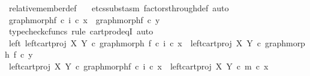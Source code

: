 \begin{isabellebody}
\ relative{\isacharunderscore}{\kern0pt}member{\isacharunderscore}{\kern0pt}def{}\ \isamarkupfalse%
\ {\isacharparenleft}{\kern0pt}{\isacharminus}{\kern0pt}{\isacharcomma}{\kern0pt}\ etcs{\isacharunderscore}{\kern0pt}subst{\isacharunderscore}{\kern0pt}asm\ factors{\isacharunderscore}{\kern0pt}through{\isacharunderscore}{\kern0pt}def{}{\isacharcomma}{\kern0pt}\ auto{\isacharparenright}{\kern0pt}\isanewline
\isanewline
\ \ \ \ \ \ \isamarkupfalse%
\ {\isachardoublequoteopen}graph{\isacharunderscore}{\kern0pt}morph{\isacharparenleft}{\kern0pt}f{\isacharparenright}{\kern0pt}\ {\isasymcirc}\isactrlsub c\ i\ {\isasymcirc}\isactrlsub c\ x{\isacharprime}{\kern0pt}\ {\isacharequal}{\kern0pt}\ graph{\isacharunderscore}{\kern0pt}morph{\isacharparenleft}{\kern0pt}f{\isacharparenright}{\kern0pt}\ {\isasymcirc}\isactrlsub c\ y{\isacharprime}{\kern0pt}{\isachardoublequoteclose}\isanewline
\ \ \ \ \ \ \isamarkupfalse%
\ {\isacharparenleft}{\kern0pt}typecheck{\isacharunderscore}{\kern0pt}cfuncs{\isacharcomma}{\kern0pt}\ rule\ cart{\isacharunderscore}{\kern0pt}prod{\isacharunderscore}{\kern0pt}eqI{\isacharcomma}{\kern0pt}\ auto{\isacharparenright}{\kern0pt}\isanewline
\ \ \ \ \ \ \ \ \isamarkupfalse%
\ left{\isacharcolon}{\kern0pt}\ {\isachardoublequoteopen}left{\isacharunderscore}{\kern0pt}cart{\isacharunderscore}{\kern0pt}proj\ X\ Y\ {\isasymcirc}\isactrlsub c\ graph{\isacharunderscore}{\kern0pt}morph\ f\ {\isasymcirc}\isactrlsub c\ i\ {\isasymcirc}\isactrlsub c\ x{\isacharprime}{\kern0pt}\ {\isacharequal}{\kern0pt}\ left{\isacharunderscore}{\kern0pt}cart{\isacharunderscore}{\kern0pt}proj\ X\ Y\ {\isasymcirc}\isactrlsub c\ graph{\isacharunderscore}{\kern0pt}morph\ f\ {\isasymcirc}\isactrlsub c\ y{\isacharprime}{\kern0pt}{\isachardoublequoteclose}\isanewline
\ \ \ \ \ \ \ \ \isamarkupfalse%
\ {\isacharminus}{\kern0pt}\isanewline
\ \ \ \ \ \ \ \ \ \ \isamarkupfalse%
\ {\isachardoublequoteopen}left{\isacharunderscore}{\kern0pt}cart{\isacharunderscore}{\kern0pt}proj\ X\ Y\ {\isasymcirc}\isactrlsub c\ graph{\isacharunderscore}{\kern0pt}morph{\isacharparenleft}{\kern0pt}f{\isacharparenright}{\kern0pt}\ {\isasymcirc}\isactrlsub c\ i\ {\isasymcirc}\isactrlsub c\ x{\isacharprime}{\kern0pt}\ {\isacharequal}{\kern0pt}\ left{\isacharunderscore}{\kern0pt}cart{\isacharunderscore}{\kern0pt}proj\ X\ Y\ {\isasymcirc}\isactrlsub c\ m\ {\isasymcirc}\isactrlsub c\ x{\isacharprime}{\kern0pt}{\isachardoublequoteclose}\isanewline
\ \ \ \ \ \ \ \ \ \ \ \ \isamarkupfalse%

\end{isabellebody}

